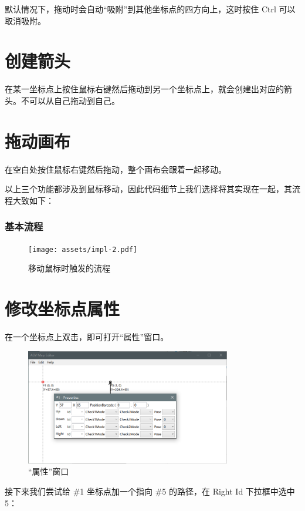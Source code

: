 默认情况下，拖动时会自动``吸附''到其他坐标点的四方向上，这时按住 Ctrl 可以取消吸附。

\section{创建箭头}

在某一坐标点上按住鼠标右键然后拖动到另一个坐标点上，就会创建出对应的箭头。不可以从自己拖动到自己。

\section{拖动画布}

在空白处按住鼠标右键然后拖动，整个画布会跟着一起移动。

以上三个功能都涉及到鼠标移动，因此代码细节上我们选择将其实现在一起，其流程大致如下：

\subsubsection{基本流程}

\begin{figure}[H]
    \centering
    \texttt{[image: assets/impl-2.pdf]}
    \caption{移动鼠标时触发的流程}
    \label{fig:impl-2}
\end{figure}

\section{修改坐标点属性}

在一个坐标点上双击，即可打开``属性''窗口。

\begin{figure}[H]
  \centering
  \includegraphics[width=0.8\textwidth]{assets/prop.png}
  \caption{``属性''窗口}
  \label{fig:prop}
\end{figure}

接下来我们尝试给 \#1 坐标点加一个指向 \#5 的路径，在 Right Id 下拉框中选中 5：

